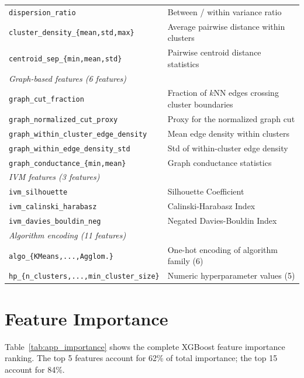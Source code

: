 \documentclass[10pt]{article} %
\begin{document}
\begin{table}[h]
\begin{tabular}{lp{7cm}}
\texttt{dispersion\_ratio} & Between / within variance ratio \\
\texttt{cluster\_density\_\{mean,std,max\}} & Average pairwise distance within clusters \\
\texttt{centroid\_sep\_\{min,mean,std\}} & Pairwise centroid distance statistics \\
\midrule
\multicolumn{2}{l}{\textit{Graph-based features (6 features)}} \\
\texttt{graph\_cut\_fraction} & Fraction of $k$NN edges crossing cluster boundaries \\
\texttt{graph\_normalized\_cut\_proxy} & Proxy for the normalized graph cut \\
\texttt{graph\_within\_cluster\_edge\_density} & Mean edge density within clusters \\
\texttt{graph\_within\_edge\_density\_std} & Std of within-cluster edge density \\
\texttt{graph\_conductance\_\{min,mean\}} & Graph conductance statistics \\
\midrule
\multicolumn{2}{l}{\textit{IVM features (3 features)}} \\
\texttt{ivm\_silhouette} & Silhouette Coefficient \\
\texttt{ivm\_calinski\_harabasz} & Calinski-Harabasz Index \\
\texttt{ivm\_davies\_bouldin\_neg} & Negated Davies-Bouldin Index \\
\midrule
\multicolumn{2}{l}{\textit{Algorithm encoding (11 features)}} \\
\texttt{algo\_\{KMeans,...,Agglom.\}} & One-hot encoding of algorithm family (6) \\
\texttt{hp\_\{n\_clusters,...,min\_cluster\_size\}} & Numeric hyperparameter values (5) \\
\bottomrule
\end{tabular}
\end{table}


\section{Feature Importance}
\label{app:importance}

Table~\ref{tab:app_importance} shows the complete XGBoost feature importance ranking. The top 5 features account for 62\% of total importance; the top 15 account for 84\%.
\end{document}

